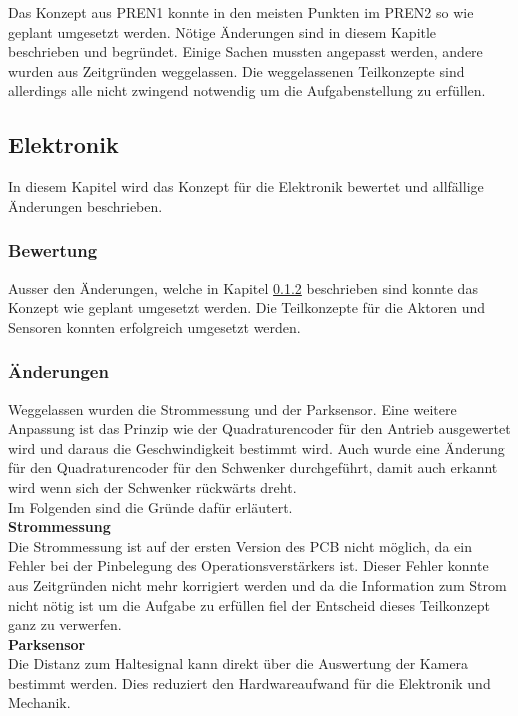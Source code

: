 \documentclass[../../main.tex]{subfiles}
\begin{document}
Das Konzept aus PREN1 konnte in den meisten Punkten im PREN2 so wie geplant umgesetzt werden. Nötige Änderungen sind in diesem Kapitle beschrieben und begründet. Einige Sachen mussten angepasst werden, andere wurden aus Zeitgründen weggelassen. Die weggelassenen Teilkonzepte sind allerdings alle nicht zwingend notwendig um die Aufgabenstellung zu erfüllen.\\

\subsection{Elektronik}
In diesem Kapitel wird das Konzept für die Elektronik bewertet und allfällige Änderungen beschrieben.

\subsubsection{Bewertung}
Ausser den Änderungen, welche in Kapitel \ref{bewertung_et_aenderungen} beschrieben sind konnte das Konzept wie geplant umgesetzt werden. Die Teilkonzepte für die Aktoren und Sensoren konnten erfolgreich umgesetzt werden.

\subsubsection{Änderungen} \label{bewertung_et_aenderungen}
Weggelassen wurden die Strommessung und der Parksensor. Eine weitere Anpassung ist das Prinzip wie der Quadraturencoder für den Antrieb ausgewertet wird und daraus die Geschwindigkeit bestimmt wird. Auch wurde eine Änderung für den Quadraturencoder für den Schwenker durchgeführt, damit auch erkannt wird wenn sich der Schwenker rückwärts dreht.\\
Im Folgenden sind die Gründe dafür erläutert.\\

\textbf{Strommessung}\\
Die Strommessung ist auf der ersten Version des PCB nicht möglich, da ein Fehler bei der Pinbelegung des Operationsverstärkers ist. Dieser Fehler konnte aus Zeitgründen nicht mehr korrigiert werden und da die Information zum Strom nicht nötig ist um die Aufgabe zu erfüllen fiel der Entscheid dieses Teilkonzept ganz zu verwerfen.\\

\textbf{Parksensor}\\
Die Distanz zum Haltesignal kann direkt über die Auswertung der Kamera bestimmt werden. Dies reduziert den Hardwareaufwand für die Elektronik und Mechanik.\\
\end{document}
